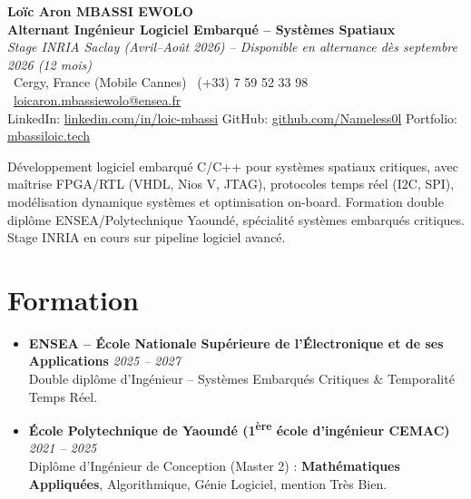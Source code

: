 \documentclass[a4paper,11pt]{article}
\begin{document}
\begin{center}
    {\Large \textbf{Lo\"ic Aron MBASSI EWOLO}} \\ \vspace{4pt}
    \textbf{\large Alternant Ing\'enieur Logiciel Embarqu\'e -- Syst\`emes Spatiaux} \\
    \textit{\small Stage INRIA Saclay (Avril--Ao\^ut 2026) -- Disponible en alternance d\`es septembre 2026 (12 mois)} \\ \vspace{4pt}
    \small
    \Pointinghand\ Cergy, France (Mobile Cannes) \quad \Mobilefone\ (+33) 7 59 52 33 98 \quad
    {\color{primary}\Letter\ \href{mailto:loicaron.mbassiewolo@ensea.fr}{loicaron.mbassiewolo@ensea.fr}} \\ \vspace{2pt}
    {\color{primary}LinkedIn: \href{https://www.linkedin.com/in/loic-mbassi/}{linkedin.com/in/loic-mbassi}} \quad
    {\color{primary}GitHub: \href{https://github.com/Nameless0l}{github.com/Nameless0l}} \quad
    {\color{primary}Portfolio: \href{https://mbassiloic.tech}{mbassiloic.tech}}
\end{center}
\vspace{-6pt}
\noindent\small{D\'eveloppement logiciel embarqu\'e C/C++ pour syst\`emes spatiaux critiques, avec maîtrise FPGA/RTL (VHDL, Nios V, JTAG), protocoles temps r\'eel (I2C, SPI), modélisation dynamique syst\`emes et optimisation on-board. Formation double dipl\^ome ENSEA/Polytechnique Yaound\'e, sp\'ecialit\'e syst\`emes embarqu\'es critiques. Stage INRIA en cours sur pipeline logiciel avanc\'e.}

\section{Formation}
\begin{itemize}[leftmargin=*, label=\tiny$\bullet$, nosep]
    \item \textbf{ENSEA -- \'Ecole Nationale Sup\'erieure de l'\'Electronique et de ses Applications} \hfill \textit{2025 -- 2027} \\
    \small{Double dipl\^ome d'Ing\'enieur -- Syst\`emes Embarqu\'es Critiques \& Temporalit\'e Temps R\'eel.}
    \item \textbf{\'Ecole Polytechnique de Yaound\'e (1\textsuperscript{\`ere} \'ecole d'ing\'enieur CEMAC)} \hfill \textit{2021 -- 2025} \\
    \small{Dipl\^ome d'Ing\'enieur de Conception (Master 2) : \textbf{Math\'ematiques Appliqu\'ees}, Algorithmique, G\'enie Logiciel, mention Tr\`es Bien.}
\end{itemize}
\end{document}

